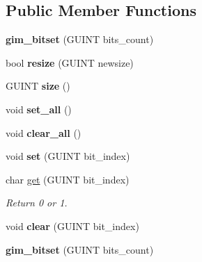 \subsection*{Public Member Functions}
\begin{DoxyCompactItemize}
\item 
\mbox{\label{classgim__bitset_aeccc093df2297681fe15ac8a834fb1b9}} 
{\bfseries gim\+\_\+bitset} (G\+U\+I\+NT bits\+\_\+count)
\item 
\mbox{\label{classgim__bitset_a0e82a6b28b87437e79c15525b55c4f8c}} 
bool {\bfseries resize} (G\+U\+I\+NT newsize)
\item 
\mbox{\label{classgim__bitset_aa07758d41967a1da50ae8f7cb04d0cc3}} 
G\+U\+I\+NT {\bfseries size} ()
\item 
\mbox{\label{classgim__bitset_a903c948276d62b7f8cbb49b369b98ab0}} 
void {\bfseries set\+\_\+all} ()
\item 
\mbox{\label{classgim__bitset_a983f1435bc37a33c9e2a259a14c29cf6}} 
void {\bfseries clear\+\_\+all} ()
\item 
\mbox{\label{classgim__bitset_a8af47716e1519bf587bad9436040c99e}} 
void {\bfseries set} (G\+U\+I\+NT bit\+\_\+index)
\item 
\mbox{\label{classgim__bitset_a62e08efb3b9c5982860ee9ebec3f31a5}} 
char \hyperlink{classgim__bitset_a62e08efb3b9c5982860ee9ebec3f31a5}{get} (G\+U\+I\+NT bit\+\_\+index)
\begin{DoxyCompactList}\small\item\em Return 0 or 1. \end{DoxyCompactList}\item 
\mbox{\label{classgim__bitset_a4a231f6d93a5e6ea21aa1b881399600d}} 
void {\bfseries clear} (G\+U\+I\+NT bit\+\_\+index)
\item 
\mbox{\label{classgim__bitset_aeccc093df2297681fe15ac8a834fb1b9}} 
{\bfseries gim\+\_\+bitset} (G\+U\+I\+NT bits\+\_\+count)
\item 
\mbox{\label{classgim__bitset_a0e82a6b28b87437e79c15525b55c4f8c}} 

\end{DoxyCompactItemize}
